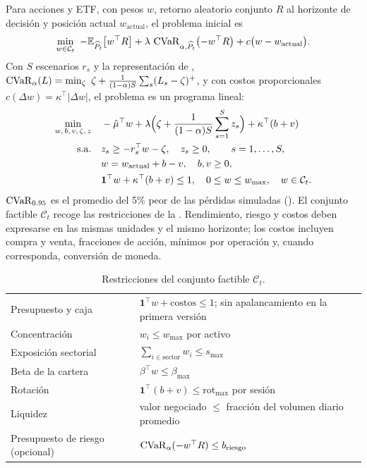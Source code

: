 Para acciones y ETF, con pesos $w$, retorno aleatorio conjunto $R$ al horizonte de decisión y posición
actual $w_{\text{actual}}$, el problema inicial es
\begin{equation}
\min_{w\in\mathcal C_t}\ -\mathbb{E}_{\widehat P_t}\bigl[w^\top R\bigr]
+\lambda\,\operatorname{CVaR}_{\alpha,\widehat P_t}\bigl(-w^\top R\bigr)+c\bigl(w-w_{\text{actual}}\bigr).
\label{eq:objetivo}
\end{equation}
Con $S$ escenarios $r_s$ y la representación de \citet{rockafellar2000},
$\CVaR_\alpha(L)=\min_\zeta\ \zeta+\frac{1}{(1-\alpha)S}\sum_s(L_s-\zeta)^+$, y con costos proporcionales
$c(\Delta w)=\kappa^\top|\Delta w|$, el problema es un programa lineal:
\begin{equation}
\begin{aligned}
\min_{w,\,b,\,v,\,\zeta,\,z}\quad & -\hat\mu^\top w+\lambda\Bigl(\zeta+\frac{1}{(1-\alpha)S}\sum_{s=1}^{S}z_s\Bigr)+\kappa^\top(b+v)\\
\text{s.a.}\quad & z_s\ge -r_s^\top w-\zeta,\quad z_s\ge 0,\qquad s=1,\dots,S,\\
& w=w_{\text{actual}}+b-v,\quad b,v\ge 0,\\
& \mathbf 1^\top w+\kappa^\top(b+v)\le 1,\quad 0\le w\le w_{\max},\quad w\in\mathcal C_t .
\end{aligned}
\label{eq:lp}
\end{equation}
$\operatorname{CVaR}_{0.95}$ es el promedio del 5\% peor de las pérdidas simuladas (). El conjunto
factible $\mathcal C_t$ recoge las restricciones de la . Rendimiento, riesgo y
costos deben expresarse en las mismas unidades y el mismo horizonte; los costos incluyen compra y venta,
fracciones de acción, mínimos por operación y, cuando corresponda, conversión de moneda.

\begin{table}[H]
\centering\small
\caption{Restricciones del conjunto factible $\mathcal C_t$.}
\label{tab:restricciones}
\begin{tabularx}{\linewidth}{@{}l Y@{}}
\toprule
{} & \\
\midrule
Presupuesto y caja & $\mathbf 1^\top w+\text{costos}\le 1$; sin apalancamiento en la primera versión\\
Concentración & $w_i\le w_{\max}$ por activo\\
Exposición sectorial & $\sum_{i\in\text{sector}}w_i\le s_{\max}$\\
Beta de la cartera & $\beta^\top w\le\beta_{\max}$\\
Rotación & $\mathbf 1^\top(b+v)\le\text{rot}_{\max}$ por sesión\\
Liquidez & valor negociado $\le$ fracción del volumen diario promedio\\
Presupuesto de riesgo (opcional) & $\operatorname{CVaR}_\alpha(-w^\top R)\le b_{\text{riesgo}}$\\
\bottomrule
\end{tabularx}
\end{table}

